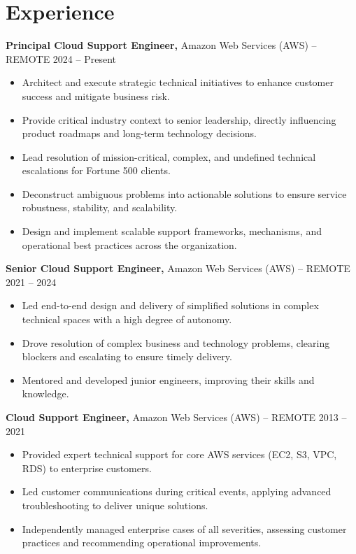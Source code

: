 \documentclass[11pt]{article}
\begin{document}
\section*{Experience}
{\large\textbf{Principal Cloud Support Engineer,}} {Amazon Web Services (AWS)} -- REMOTE \hfill 2024 -- Present \\
\vspace{-9pt}
\begin{itemize}
    \item Architect and execute strategic technical initiatives to enhance customer success and mitigate business risk.
    \item Provide critical industry context to senior leadership, directly influencing product roadmaps and long-term technology decisions.
    \item Lead resolution of mission-critical, complex, and undefined technical escalations for Fortune 500 clients.
    \item Deconstruct ambiguous problems into actionable solutions to ensure service robustness, stability, and scalability.
    \item Design and implement scalable support frameworks, mechanisms, and operational best practices across the organization.
\end{itemize}

{\large\textbf{Senior Cloud Support Engineer,}} {Amazon Web Services (AWS)} -- REMOTE \hfill 2021 -- 2024 \\
\vspace{-9pt}
\begin{itemize}
    \item Led end-to-end design and delivery of simplified solutions in complex technical spaces with a high degree of autonomy.
    \item Drove resolution of complex business and technology problems, clearing blockers and escalating to ensure timely delivery.
    \item Mentored and developed junior engineers, improving their skills and knowledge.
\end{itemize}

{\large\textbf{Cloud Support Engineer,}} {Amazon Web Services (AWS)} -- REMOTE \hfill 2013 -- 2021 \\
\vspace{-9pt}
\begin{itemize}
    \item Provided expert technical support for core AWS services (EC2, S3, VPC, RDS) to enterprise customers.
    \item Led customer communications during critical events, applying advanced troubleshooting to deliver unique solutions.
    \item Independently managed enterprise cases of all severities, assessing customer practices and recommending operational improvements.
\end{itemize}
\end{document}

